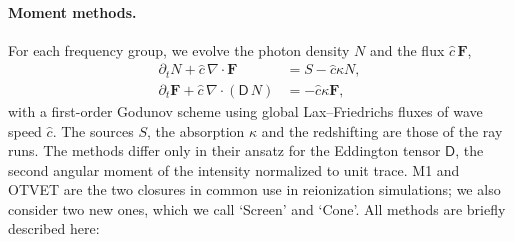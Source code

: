 \documentclass[iop]{openjournal}
\newcommand{\chat}{\hat{c}}
\begin{document}
\paragraph{Moment methods.} For each frequency group, we evolve the photon
density $N$ and the flux $\chat\,\mathbf F$,
\begin{align}
\partial_t N + \chat\,\nabla\cdot\mathbf F &= S - \chat\kappa N,\\
\partial_t \mathbf F + \chat\,\nabla\cdot(\mathsf D\,N) &= -\chat\kappa \mathbf F,
\end{align}
with a first-order Godunov scheme using global Lax--Friedrichs fluxes \citep{toro09} of
wave speed $\chat$. The sources $S$, the absorption $\kappa$ and the
redshifting are those of the ray runs. The methods differ only in their ansatz for the
Eddington tensor $\mathsf D$, the second angular moment of the intensity normalized to unit trace. M1 and OTVET are the two closures
in common use in reionization simulations; we also consider two new ones, which we call `Screen' and `Cone'. All methods are briefly described here:
\end{document}
